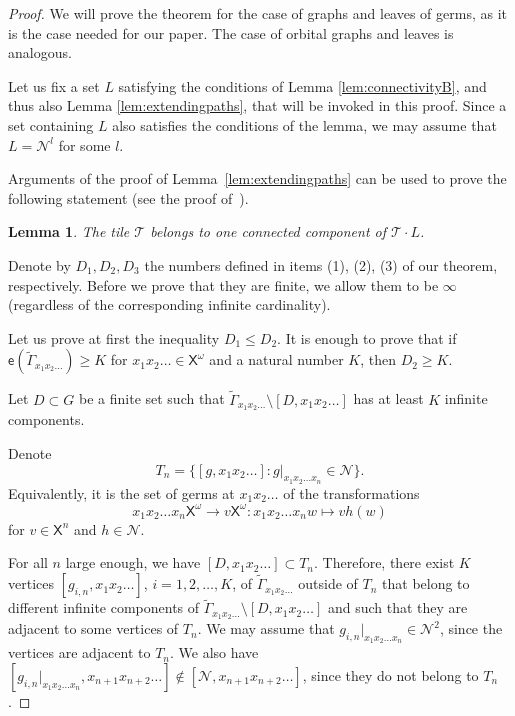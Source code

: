 \documentclass[11pt]{amsart}
\newcommand{\arr}{\longrightarrow}
\newcommand{\til}{\mathcal{T}}
\newcommand{\xo}{\alb^\omega}
\newcommand{\alb}{\ensuremath{\mathsf{X}}}%
\newcommand{\nuke}{\ensuremath{\mathcal{N}}}%
\newcommand{\Gammatilde}{\ensuremath{\widetilde{\Gamma}}}%
\newcommand{\esf}{\ensuremath{\mathsf{e}}}
\theoremstyle{definition}
\theoremstyle{plain}
\newtheorem{main thm}{Theorem}
\newtheorem{lemma}[defin]{Lemma}
\theoremstyle{remark}
\theoremstyle{plain}
\begin{document}
\begin{proof}
We will prove the theorem for the case of graphs and leaves of germs, as it is the case needed for our paper. The case of orbital graphs and leaves is analogous.




Let us fix a set $L$ satisfying the conditions of Lemma 
\ref{lem:connectivityB}, and thus also Lemma \ref{lem:extendingpaths}, that will be invoked in this proof.  Since a set containing $L$ also satisfies the conditions of the lemma, we may assume that $L=\nuke^l$ for some $l$.


Arguments of the proof of Lemma~\ref{lem:extendingpaths} can be used to prove the following statement (see the proof of~\cite[Theorem~3.5.1]{Nek:book}).

\begin{lemma}
    \label{lem:connectedtile}
The tile $\til$ belongs to one connected component of $\til\cdot L$.
\end{lemma}

Denote by $D_1, D_2, D_3$ the numbers defined in items (1), (2), (3) of our theorem, respectively. Before we prove that they are finite, we allow them to be $\infty$ (regardless of the corresponding infinite cardinality).

Let us prove at first the inequality $D_1\le D_2$. It is enough to prove that if
$\esf(\Gammatilde_{x_1x_2\ldots})\ge K$ for $x_1x_2\ldots \in\xo$ and a natural number $K$, then $D_2\ge K$.

Let $D\subset G$  be a finite set such that $\Gammatilde_{x_1x_2\ldots}\setminus [D, x_1x_2\ldots]$ has at least $K$ infinite components. 


Denote
\[T_n=\{[g, x_1x_2\ldots]\colon g|_{x_1x_2\ldots x_n}\in\nuke\}.\]
Equivalently, it is the set of germs at $x_1x_2\ldots$ of the transformations \[x_1x_2\ldots x_n\xo\arr v\xo\colon x_1x_2\ldots x_nw\mapsto v h(w)\] for $v\in\alb^n$ and $h\in\nuke$.

For all $n$ large enough, we have $[D, x_1x_2\ldots]\subset T_n$. 
Therefore, there exist $K$ vertices $[g_{i, n}, x_1x_2\ldots]$, $i=1, 2, \ldots, K$, of $\Gammatilde_{x_1x_2\ldots}$ outside of $T_n$ that belong to different infinite components of $\Gammatilde_{x_1x_2\ldots}\setminus [D, x_1x_2\ldots]$ and such that they are adjacent to some vertices of $T_n$. We may assume that $g_{i, n}|_{x_1x_2\ldots x_n}\in\nuke^2$, since the vertices are adjacent to $T_n$. We also have $[g_{i, n}|_{x_1x_2\ldots x_n}, x_{n+1}x_{n+2}\ldots]\notin [\nuke, x_{n+1}x_{n+2}\ldots]$, since they do not belong to $T_n$. 


\end{proof}
\end{document}
